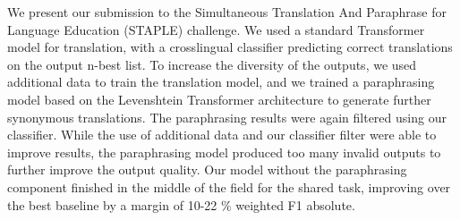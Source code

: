 We present our submission to the Simultaneous Translation And Paraphrase for Language Education (STAPLE) challenge. We used a standard Transformer model for translation, with a crosslingual classifier predicting correct translations on the output n-best list. To increase the diversity of the outputs, we used additional data to train the translation model, and we trained a paraphrasing model based on the Levenshtein Transformer architecture to generate further synonymous translations. The paraphrasing results were again filtered using our classifier. While the use of additional data and our classifier filter were able to improve results, the paraphrasing model produced too many invalid outputs to further improve the output quality. Our model without the paraphrasing component finished in the middle of the field for the shared task, improving over the best baseline by a margin of 10-22 \% weighted F1 absolute.
